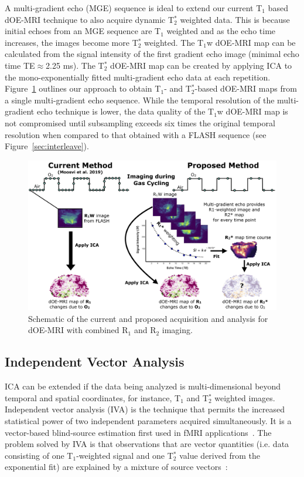 A multi-gradient echo (\acs{MGE}) sequence is ideal to extend our current T$_1$ based dOE-MRI technique to also acquire dynamic T$_2^*$ weighted data.
This is because initial echoes from an \acs{MGE} sequence are T$_1$ weighted and as the echo time increases, the images become more T$_2^*$ weighted. 
The T$_1$w \acs{dOE-MRI} map can be calculated from the signal intensity of the first gradient echo image (minimal echo time TE$\approx$2.25 ms). 
The T$_2^*$ \acs{dOE-MRI} map can be created by applying \acs{ICA} to the mono-exponentially fitted multi-gradient echo data at each repetition. 
Figure~\ref{MGE_schematic} outlines our approach to obtain T$_1$- and T$_2^*$-based \acs{dOE-MRI} maps from a single multi-gradient echo sequence. 
While the temporal resolution of the multi-gradient echo technique is lower, the data quality of the T$_1$w \acs{dOE-MRI} map is not compromised until subsampling exceeds six times the original temporal resolution when compared to that obtained with a \acs{FLASH} sequence (see Figure~\ref{sec:interleave}).

\begin{figure}[htbp]
   \centering
   \includegraphics[width=\textwidth]{futurework/futurework-images/grantfig4_MGE_schematic.png} %
   \caption{Schematic of the current and proposed acquisition and analysis for \acs{dOE-MRI} with combined R$_1$ and R$_2$ imaging.
   \label{MGE_schematic}}
\end{figure}

\subsection{Independent Vector Analysis}

\acs{ICA} can be extended if the data being analyzed is multi-dimensional beyond temporal and spatial coordinates, for instance, T$_1$ and T$_2^*$ weighted images.
Independent vector analysis (\acs{IVA}) is the technique that permits the increased statistical power of two independent parameters acquired simultaneously.
It is a vector-based blind-source estimation first used in \acs{fMRI} applications~\cite{Lee:2008dc}. 
The problem solved by \acs{IVA} is that observations that are vector quantities (i.e. data consisting of one T$_1$-weighted signal and one T$_2^*$ value derived from the exponential fit) are explained by a mixture of source vectors~\cite{Lee:2008dc}:

